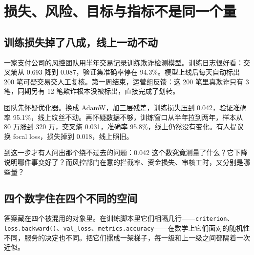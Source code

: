 \section{损失、风险、目标与指标不是同一个量}
\label{sec:13-Machine-Learning/01-Learning-Problems-and-Evaluation/02}

\subsection{训练损失掉了八成，线上一动不动}

一家支付公司的风控团队用半年交易记录训练欺诈检测模型。训练日志很好看：交叉熵从 0.693 降到 0.087，验证集准确率停在 94.3\%。模型上线后每天自动标出 200 笔可疑交易交人工复核。第一周结束，运营组反馈：这 200 笔里真欺诈只有 3 笔，同期另有 12 笔欺诈根本没被标出，直接完成了划转。

团队先怀疑优化器。换成 AdamW，加三层残差，训练损失压到 0.042，验证准确率 95.1\%，线上纹丝不动。再怀疑数据不够，训练窗口从半年拉到两年，样本从 80 万涨到 320 万，交叉熵 0.031，准确率 95.8\%，线上仍然没有变化。有人提议换 focal loss，损失掉到 0.018，线上照旧。

到这一步才有人问出那个绕不过去的问题：0.042 这个数究竟测量了什么？它下降说明哪件事变好了？而风控部门在意的拦截率、资金损失、审核工时，又分别是哪些量？

\subsection{四个数字住在四个不同的空间}

答案藏在四个被混用的对象里。在训练脚本里它们相隔几行——\texttt{criterion}、\texttt{loss.backward()}、\texttt{val\_loss}、\texttt{metrics.accuracy}——在数学上它们面对的随机性不同，服务的决定也不同。把它们摞成一架梯子，每一级和上一级之间都隔着一次近似。

